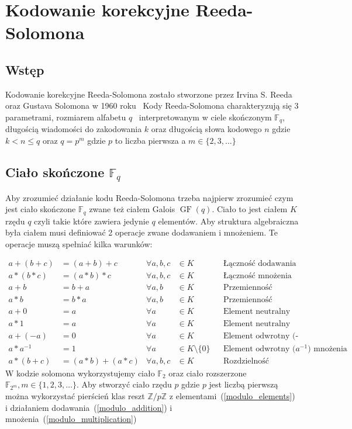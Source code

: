 \section{Kodowanie korekcyjne Reeda-Solomona}
\subsection{Wstęp}

Kodowanie korekcyjne Reeda-Solomona zostało stworzone przez Irvina S. Reeda
oraz Gustava Solomona w 1960 roku~\cite{Reed-Solomon-original}
Kody Reeda-Solomona charakteryzują się 3 parametrami, rozmiarem alfabetu $q$~\cite{Reed-Solomon-Encoding-Decoding}
interpretowanym w ciele skończonym $\mathbb{F}_q$, długością wiadomości do
zakodowania $k$ oraz długością słowa kodowego $n$ gdzie $k < n \leq q$ oraz
$q=p^m$ gdzie $p$ to liczba pierwsza a $m \in \{ 2, 3, \ldots \}$

\subsection{Ciało skończone $\mathbb{F}_{q}$}

Aby zrozumieć działanie kodu Reeda-Solomona trzeba najpierw zrozumieć czym jest
ciało skończone $\mathbb{F}_q$ zwane też ciałem Galois $\operatorname{GF}(q)$.
Ciało to jest ciałem $K$ rzędu $q$ czyli takie które zawiera jedynie $q$ elementów.
Aby struktura algebraiczna była ciałem musi definiować 2 operacje zwane
dodawaniem i mnożeniem.
Te operacje muszą spełniać kilka warunków:

{\small
    \begin{align}
        a + (b + c) &= (a + b) + c & \forall a,b,c &\in K && \text{Łączność dodawania} \\
        a*(b*c) &= (a*b)*c & \forall a,b,c &\in K && \text{Łączność mnożenia} \\
        a + b &= b + a & \forall a,b &\in K && \text{Przemienność dodawania} \\
        a * b &= b * a & \forall a,b &\in K && \text{Przemienność mnożenia} \\
        a + 0 &= a & \forall a &\in K && \text{Element neutralny (0) dodawania} \\
        a * 1 &= a & \forall a &\in K && \text{Element neutralny (1) mnożenia} \\
        a + (-a) &= 0 & \forall a &\in K && \text{Element odwrotny (-a) dodawania} \\
        a*a^{-1} &= 1 & \forall a &\in K \setminus \{ 0 \} &&
            \text{Element odwrotny (} a^{-1} \text{) mnożenia} \label{field_mul_inverse}\\
        a*(b + c) &= (a*b) + (a*c) & \forall a,b,c &\in K &&
            \text{Rozdzielność mnożenia względem dodawania}
    \end{align}
}%
W kodzie solomona wykorzystujemy ciało $\mathbb{F}_2$ oraz ciało rozszerzone
$\mathbb{F}_{2^m}, m \in \{ 1, 2, 3, \ldots \}$.
Aby stworzyć ciało rzędu $p$ gdzie $p$ jest liczbą pierwszą można wykorzystać
pierścień klas reszt $\mathbb{Z} / p \mathbb{Z}$ z elementami~(\ref{modulo_elements})
i działaniem dodawania~(\ref{modulo_addition}) i mnożenia~(\ref{modulo_multiplication})

